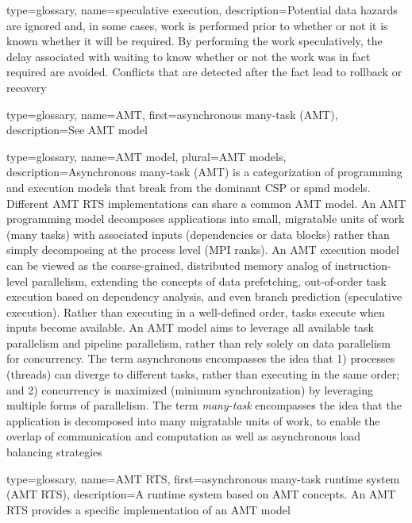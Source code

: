 {
  type=glossary,
  name={speculative execution},
  description={Potential data hazards are ignored and, in some cases, work is performed prior to
    whether or not it is known whether it will be required.  By performing the
      work speculatively, the delay associated with waiting to know whether or not the work
      was in fact required are avoided. Conflicts that are detected after the
      fact lead to rollback or recovery}
}

{
  type=glossary,
  name={AMT},
  first={asynchronous many-task (AMT)},
  description={See \gls{AMT model}}
}

{
  type=glossary,
  name={AMT model},
  plural={AMT models},
  description={Asynchronous many-task (AMT) is a categorization of programming
    and \glspl{execution model} that break from the dominant \gls{CSP} or \gls{spmd} models.
      Different \gls{AMT RTS} implementations can share a common AMT model.
	An AMT \gls{programming model} decomposes applications into small,
  \gls{migratable} units of work (many tasks) with associated inputs (dependencies or data blocks) rather than simply decomposing at the process level (\gls{MPI} ranks).
	An AMT \gls{execution model} can be viewed as the coarse-grained, distributed memory analog of instruction-level parallelism, extending the concepts of data prefetching,
	out-of-order task execution based on dependency analysis, and even branch
    prediction (\gls{speculative execution}). 
	Rather than executing in a well-defined order, tasks execute when inputs become available.
	An AMT model aims to leverage all available \gls{task parallelism} and
  \gls{pipeline parallelism},
  rather than rely solely on \gls{data parallelism} for \gls{concurrency}.
	The term asynchronous encompasses the idea that 1) processes (threads) can
  diverge to different tasks, rather than executing in the same order; and 2)
  \gls{concurrency} is maximized (minimum synchronization) by leveraging multiple forms of parallelism.
	The term {\em many-task} encompasses the idea that the application is
  decomposed into many \gls{migratable} units of work, to enable the overlap of
  communication and computation as well as \gls{asynchronous} load balancing strategies}
}



{
  type=glossary,
  name={AMT RTS},
  first={asynchronous many-task runtime system (AMT RTS)},
  description={A runtime system based on \gls{AMT} concepts. An AMT RTS provides a specific implementation of an \gls{AMT model}}
}

